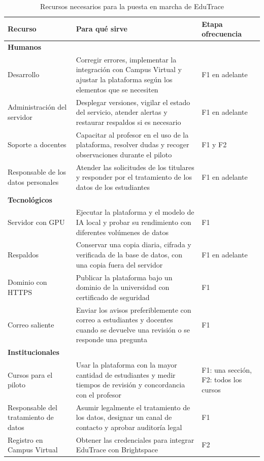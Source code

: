 \documentclass[letterpaper, 10 pt, conference]{ieeeconf}
\begin{document}
\begin{table}[t]
\centering
\footnotesize
\caption{Recursos necesarios para la puesta en marcha de EduTrace}
\label{tab:recursos}
\begin{tabular}{|p{3.6cm}|p{10.6cm}|p{2.4cm}|}
\hline
\textbf{Recurso} & \textbf{Para qué sirve} & \textbf{Etapa o\newline frecuencia} \\
\hline
\multicolumn{3}{|l|}{\textbf{Humanos}} \\ \hline

Desarrollo & Corregir errores, implementar la integración con Campus Virtual y ajustar la plataforma según los elementos que se necesiten & F1 en adelante \\ \hline
Administración del servidor & Desplegar versiones, vigilar el estado del servicio, atender alertas y restaurar respaldos si es necesario & F1 en adelante \\ \hline
Soporte a docentes & Capacitar al profesor en el uso de la plataforma, resolver dudas y recoger observaciones durante el piloto & F1 y F2 \\ \hline
Responsable de los datos personales & Atender las solicitudes de los titulares y responder por el tratamiento de los datos de los estudiantes & F1 en adelante \\ \hline

\multicolumn{3}{|l|}{\textbf{Tecnológicos}} \\ \hline
Servidor con GPU & Ejecutar la plataforma y el modelo de IA local y probar su rendimiento con diferentes volúmenes de datos & F1 \\ \hline
Respaldos & Conservar una copia diaria, cifrada y verificada de la base de datos, con una copia fuera del servidor & F1 en adelante \\ \hline
Dominio con HTTPS & Publicar la plataforma bajo un dominio de la universidad con certificado de seguridad & F1 \\ \hline
Correo saliente & Enviar los avisos preferiblemente con correo a estudiantes y docentes cuando se devuelve una revisión o se responde una pregunta & F1 \\ \hline

\multicolumn{3}{|l|}{\textbf{Institucionales}} \\ \hline
Cursos para el piloto & Usar la plataforma con la mayor cantidad de estudiantes y medir tiempos de revisión y concordancia con el profesor & F1: una sección, F2: todos los cursos \\ \hline
Responsable del tratamiento de datos & Asumir legalmente el tratamiento de los datos, designar un canal de contacto y aprobar auditoría legal & F1 \\ \hline
Registro en Campus Virtual & Obtener las credenciales para integrar EduTrace con Brightspace & F2 \\ \hline


\end{tabular}
\end{table}
\end{document}
